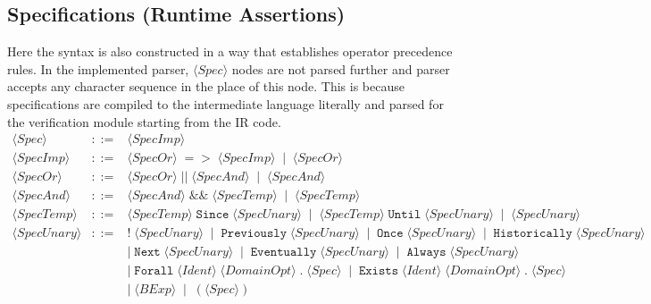 \documentclass{article}
\begin{document}
\subsection{Specifications (Runtime Assertions)}
Here the syntax is also constructed in a way that establishes operator precedence rules. In the implemented parser, $\langle \mathit{Spec} \rangle$ nodes are not parsed further and parser accepts any character sequence in the place of this node. This is because specifications are compiled to the intermediate language literally and parsed for the verification module starting from the IR code.\footnotemark
\[
\begin{array}{rcl}
\langle \mathit{Spec} \rangle
&::=&
\langle \mathit{SpecImp} \rangle \\[4pt]

\langle \mathit{SpecImp} \rangle
&::=&
\langle \mathit{SpecOr} \rangle\;\mathtt{=>}\;\langle \mathit{SpecImp} \rangle
\;\mid\;
\langle \mathit{SpecOr} \rangle \\[4pt]

\langle \mathit{SpecOr} \rangle
&::=&
\langle \mathit{SpecOr} \rangle\;\mathtt{||}\;\langle \mathit{SpecAnd} \rangle
\;\mid\;
\langle \mathit{SpecAnd} \rangle \\[4pt]

\langle \mathit{SpecAnd} \rangle
&::=&
\langle \mathit{SpecAnd} \rangle\;\mathtt{\&\&}\;\langle \mathit{SpecTemp} \rangle
\;\mid\;
\langle \mathit{SpecTemp} \rangle \\[4pt]

\langle \mathit{SpecTemp} \rangle
&::=&
\langle \mathit{SpecTemp} \rangle\;\mathtt{Since}\;\langle \mathit{SpecUnary} \rangle
\;\mid\;
\langle \mathit{SpecTemp} \rangle\;\mathtt{Until}\;\langle \mathit{SpecUnary} \rangle
\;\mid\;
\langle \mathit{SpecUnary} \rangle \\[4pt]

\langle \mathit{SpecUnary} \rangle
&::=&
\mathtt{!}\;\langle \mathit{SpecUnary} \rangle
\;\mid\;
\mathtt{Previously}\;\langle \mathit{SpecUnary} \rangle
\;\mid\;
\mathtt{Once}\;\langle \mathit{SpecUnary} \rangle
\;\mid\;
\mathtt{Historically}\;\langle \mathit{SpecUnary} \rangle \\[2pt]
&&
\mid\;
\mathtt{Next}\;\langle \mathit{SpecUnary} \rangle
\;\mid\;
\mathtt{Eventually}\;\langle \mathit{SpecUnary} \rangle
\;\mid\;
\mathtt{Always}\;\langle \mathit{SpecUnary} \rangle \\[2pt]
&&
\mid\;
\mathtt{Forall}\;\langle \mathit{Ident} \rangle\;\langle \mathit{DomainOpt} \rangle\;\texttt{.}\;\langle \mathit{Spec} \rangle
\;\mid\;
\mathtt{Exists}\;\langle \mathit{Ident} \rangle\;\langle \mathit{DomainOpt} \rangle\;\texttt{.}\;\langle \mathit{Spec} \rangle \\[2pt]
&&
\mid\;
\langle \mathit{BExp} \rangle
\;\mid\;
(\langle \mathit{Spec} \rangle) \\[4pt]


\end{array}\]
\end{document}
